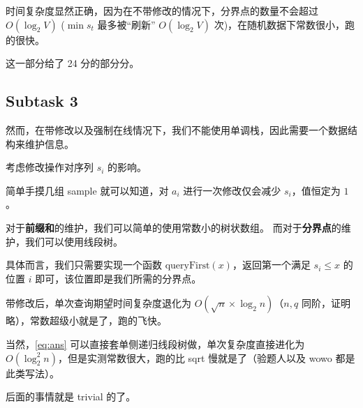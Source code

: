 \documentclass[14pt,a4paper]{article}
\begin{document}
时间复杂度显然正确，因为在不带修改的情况下，分界点的数量不会超过 $O(\log_2 V)$ ($\min s_t$ 最多被“刷新” $O(\log_2 V)$ 次)，在随机数据下常数很小，跑的很快。

这一部分给了 24 分的部分分。

\subsection{Subtask 3}
然而，在带修改以及强制在线情况下，我们不能使用单调栈，因此需要一个数据结构来维护信息。

考虑修改操作对序列 $s_i$ 的影响。

简单手摸几组 sample 就可以知道，对 $a_i$ 进行一次修改仅会减少 $s_i$，值恒定为 $1$。

对于\textbf{前缀和}的维护，我们可以简单的使用常数小的树状数组。
而对于\textbf{分界点}的维护，我们可以使用线段树。

具体而言，我们只需要实现一个函数 $\text{queryFirst}(x) $，返回第一个满足 $s_i \le x$ 的位置 $i$ 即可，该位置即是我们所需的分界点。

带修改后，单次查询期望时间复杂度退化为 $O(\sqrt{n} \times \log_2 n)$（$n,q$ 同阶，证明略），常数超级小就是了，跑的飞快。

当然，\eqref{eq:ans} 可以直接套单侧递归线段树做，单次复杂度直接进化为 $O(\log_2^2 n)$，但是实测常数很大，跑的比 sqrt 慢就是了（验题人以及 wowo 都是此类写法）。

后面的事情就是 trivial 的了。
\end{document}
